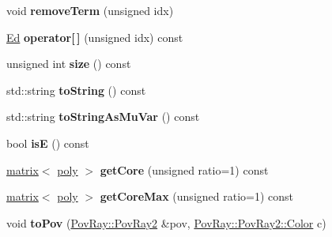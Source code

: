 \begin{DoxyCompactItemize}
\mbox{\label{classetvo_i_i_1_1poly_ed_acc22bfd6913bf19d462581258aba6eee}} 
void {\bfseries remove\+Term} (unsigned idx)
\item 
\mbox{\label{classetvo_i_i_1_1poly_ed_a5924ce227c6686c3aba963369942348e}} 
\mbox{\hyperlink{classetvo_i_i_1_1_ed}{Ed}} {\bfseries operator\mbox{[}$\,$\mbox{]}} (unsigned idx) const
\item 
\mbox{\label{classetvo_i_i_1_1poly_ed_a0144c07553cabc8f5ed6756310091e01}} 
unsigned int {\bfseries size} () const
\item 
\mbox{\label{classetvo_i_i_1_1poly_ed_a1d48eeb38de8e92a735c7d7761859c60}} 
std\+::string {\bfseries to\+String} () const
\item 
\mbox{\label{classetvo_i_i_1_1poly_ed_ae33ce685d8b683627e81cf68b0f231b3}} 
std\+::string {\bfseries to\+String\+As\+Mu\+Var} () const
\item 
\mbox{\label{classetvo_i_i_1_1poly_ed_a88a7b88edeedab27791238f016a73fde}} 
bool {\bfseries isE} () const
\item 
\mbox{\label{classetvo_i_i_1_1poly_ed_abed05f75b2eea96f0611d4f03cc290ea}} 
\mbox{\hyperlink{classetvo_i_i_1_1matrix}{matrix}}$<$ \mbox{\hyperlink{classetvo_i_i_1_1poly}{poly}} $>$ {\bfseries get\+Core} (unsigned ratio=1) const
\item 
\mbox{\label{classetvo_i_i_1_1poly_ed_a054fba51c041896ec929d93fc064ab02}} 
\mbox{\hyperlink{classetvo_i_i_1_1matrix}{matrix}}$<$ \mbox{\hyperlink{classetvo_i_i_1_1poly}{poly}} $>$ {\bfseries get\+Core\+Max} (unsigned ratio=1) const
\item 
\mbox{\label{classetvo_i_i_1_1poly_ed_a7c7533bedf4db97d625e5a9992935c0c}} 
void {\bfseries to\+Pov} (\mbox{\hyperlink{class_pov_ray_1_1_pov_ray2}{Pov\+Ray\+::\+Pov\+Ray2}} \&pov, \mbox{\hyperlink{class_pov_ray_1_1_pov_ray2_1_1_color}{Pov\+Ray\+::\+Pov\+Ray2\+::\+Color}} c)
\end{DoxyCompactItemize}
